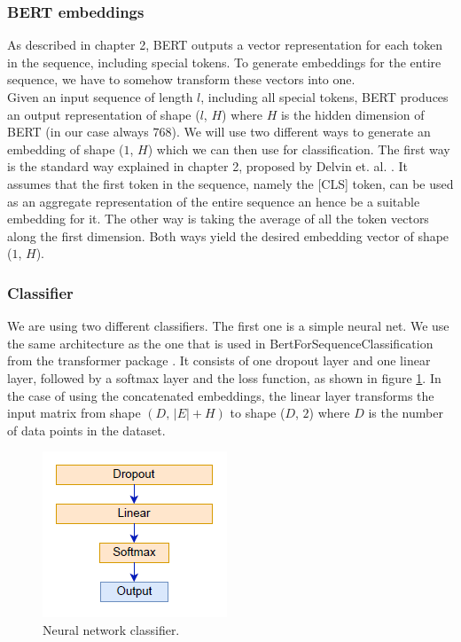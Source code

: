 \subsubsection{BERT embeddings}
As described in chapter 2, BERT outputs a vector representation for each token in the sequence, including special tokens. To generate embeddings for the entire sequence, we have to somehow transform these vectors into one. \\
Given an input sequence of length $l$, including all special tokens, BERT produces an output representation of shape ($l$, $H$) where $H$ is the hidden dimension of BERT (in our case always $768$). We will use two different ways to generate an embedding of shape ($1$, $H$) which we can then use for classification. The first way is the standard way explained in chapter 2, proposed by Delvin et. al. \cite{bert}. It assumes that the first token in the sequence, namely the [CLS] token, can be used as an aggregate representation of the entire sequence an hence be a suitable embedding for it. The other way is taking the average of all the token vectors along the first dimension. Both ways yield the desired embedding vector of shape ($1$, $H$).

\subsubsection{Classifier}
We are using two different classifiers. The first one is a simple neural net. We use the same architecture as the one that is used in BertForSequenceClassification from the transformer package \cite{bertimpl}. It consists of one dropout layer and one linear layer, followed by a softmax layer and the loss function, as shown in figure \ref{fig:nn1}. In the case of using the concatenated embeddings, the linear layer transforms the input matrix from shape $(D, \, |E| + H)$ to shape ($D$, $2$) where $D$ is the number of data points in the dataset. 

\begin{figure}[h]
  \centering
  \includegraphics[scale=1]{fig/nn_1.png}
  \caption{Neural network classifier.}%
  \label{fig:nn1}
\end{figure}


